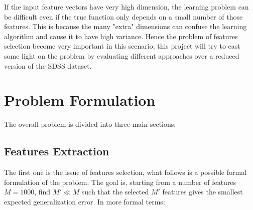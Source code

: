 \documentclass[a4paper,10pt]{article}
\begin{document}
  If the input feature vectors have very high dimension, the learning problem can be difficult even if the true function only depends on a small number of those features.
  This is because the many "extra" dimensions can confuse the learning algorithm and cause it to have high variance.
  Hence the problem of features selection become very important in this scenario; this project will try to cast
  some light on the problem by evaluating different approaches over a reduced version of the SDSS dataset.
  
\section{Problem Formulation}
  The overall problem is divided into three main sections:
  \subsection{Features Extraction}
  The first one is the issue of features selection, what follows is a possible formal formulation of the problem:\newline
  The goal is, starting from a number of features $ M = 1000 $, find $M' \ll M$ such that 
  the selected $M'$ features gives the smallest expected generalization error. In more formal terms:\newline\newline
  
\end{document}
